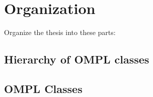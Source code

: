 \chapter{Organization}
\label{sec:organization}

Organize the thesis into these parts:
\section{Hierarchy of OMPL classes}
\label{sec:label}

\section{OMPL Classes}
\label{sec:label}







